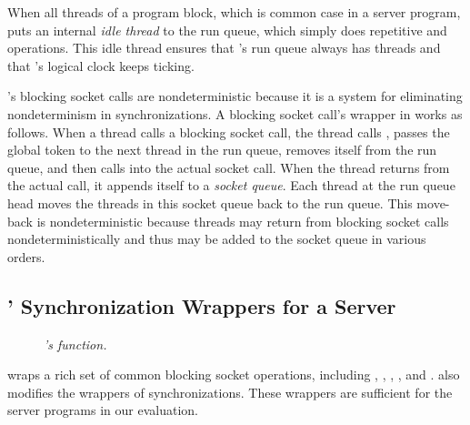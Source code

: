 When all threads of a program block, which is common case in a server 
program, \parrot puts an internal \emph{idle thread} to the run queue, which 
simply does repetitive \getturn and \putturn operations. This idle thread 
ensures that \parrot's run queue always has threads and that \parrot's logical 
clock keeps ticking.

\parrot's blocking socket calls are nondeterministic because it 
is a \dmt system for eliminating nondeterminism in \pthread 
synchronizations. A blocking socket call's wrapper in \parrot works as 
follows. When a thread calls a blocking socket call, the thread 
calls \getturn, passes the global token to the next thread in the run 
queue, removes itself from the run queue, and then calls into the 
actual socket call. When the thread returns from the actual call, it appends 
itself to a \emph{socket queue}. Each thread at the run queue head moves the 
threads in this socket queue back to the run queue. This move-back is 
nondeterministic because threads may return from blocking socket calls 
nondeterministically and thus may be added to the socket queue in various 
orders.

\subsection{\xxx' Synchronization Wrappers for a Server}
\label{sec:socket-wrappers}

\begin{figure}[t]
\centering
\begin{minipage}{.5\textwidth}
\end{minipage}
\vspace{-.1in}
\caption{{\em \xxx's \checktimebubble function.}} 
\label{fig:checktimebubble}
\vspace{-.10in}
\end{figure}

\xxx wraps a rich set of common blocking socket operations, including \select, 
\poll, \epollwait, \accept, and \recv. \xxx also modifies the wrappers of 
\pthread synchronizations. These wrappers are sufficient for the server 
programs in our evaluation.


